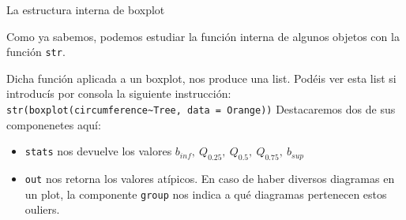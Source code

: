 \documentclass[
  ignorenonframetext,
]{beamer}
\providecommand{\tightlist}{%
  \setlength{\itemsep}{0pt}\setlength{\parskip}{0pt}}
\begin{document}
\begin{frame}[fragile]{La estructura interna de boxplot}
\protect\hypertarget{la-estructura-interna-de-boxplot}{}

Como ya sabemos, podemos estudiar la función interna de algunos objetos
con la función \texttt{str}.

Dicha función aplicada a un boxplot, nos produce una list. Podéis ver
esta list si introducís por consola la siguiente instrucción:
\texttt{str(boxplot(circumference\textasciitilde{}Tree,\ data\ =\ Orange))}
Destacaremos dos de sus componenetes aquí:

\begin{itemize}
\tightlist
\item
  \texttt{stats} nos devuelve los valores
  \(b_{inf},\ Q_{0.25},\ Q_{0.5},\ Q_{0.75},\ b_{sup}\)
\item
  \texttt{out} nos retorna los valores atípicos. En caso de haber
  diversos diagramas en un plot, la componente \texttt{group} nos indica
  a qué diagramas pertenecen estos ouliers.
\end{itemize}

\end{frame}
\end{document}
